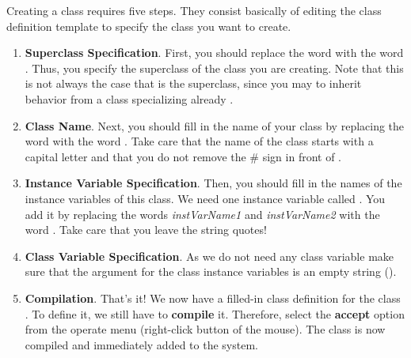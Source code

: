 
Creating a class requires five steps. They consist basically of
editing the class definition template to specify the class you
want to create. 

\begin{enumerate}
\item \textbf{Superclass Specification}. First, you should replace
the word  with the word . Thus, you specify the superclass of the class you are creating. Note that this is not always the case that  is the superclass, since you may to inherit behavior from a class specializing already .

\item \textbf{Class Name}. Next, you should fill in the name of
your class by replacing the word  with the
word . Take care that the name of the class
starts with a capital letter and that you do not remove the \#
sign in front of .

\item \textbf{Instance Variable Specification}. Then, you should
fill in the names of the instance variables of this class. We need
one instance variable called . You add it by
replacing the words \textit{instVarName1} and
\textit{instVarName2} with the word . Take
care that you leave the string quotes!

\item \textbf{Class Variable Specification}. As we do not need any class variable make sure that the argument  for the class instance variables is an empty string ().

\item \textbf{Compilation}. That's it! We now have a filled-in
class definition for the class . To define it, we still have to \textbf{compile} it. Therefore,
select the \textbf{accept} option from the operate menu
(right-click button of the mouse). The class
 is now compiled and immediately added to the system.
\end{enumerate}


